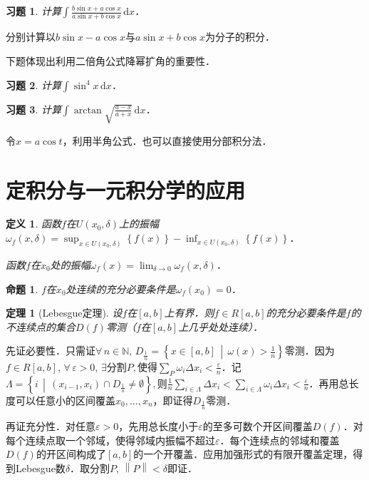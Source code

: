 \documentclass[11pt,a4paper]{ctexart}
\makeatletter
\theoremstyle{thmseries} %
\newtheorem{thm}{定理}[section]
\newtheorem{prop}{命题}[section]
\theoremstyle{exerseries}
\newtheorem{defn}{定义}[section]
\newtheorem{exer}{习题}[section]
\renewenvironment{proof}[1][\proofname]{\par
  \pushQED{\qed}%
  \normalfont \topsep6\p@\@plus6\p@\relax
  \trivlist
  \item[\hskip\labelsep
        \itshape
    #1\@addpunct{}]\ignorespaces
}{%
  \popQED\endtrivlist\@endpefalse
}
\newenvironment{sol}{\begin{proof}[\bfseries\upshape 解\quad]}{\end{proof}}
\newenvironment{pf}{\begin{proof}[\bfseries\upshape 证\quad]}{\end{proof}}
\newcommand{\cbra}[1]{\mathopen{}\left\{#1\right\}}
\renewcommand{\epsilon}{\varepsilon}
\newcommand{\N}{\mathbb{N}}
\renewcommand{\d}{\mathrm{d}}
\newcommand{\norm}[1]{\left\lVert #1 \right\rVert}
\makeatother
\begin{document}
\begin{exer}
	计算$\int\frac{b\sin x+a\cos x}{a\sin x+b\cos x}\,\d x$．
\end{exer}
\begin{sol}
	分别计算以$b\sin x-a\cos x$与$a\sin x+b\cos x$为分子的积分．
\end{sol}

下题体现出利用二倍角公式降幂扩角的重要性．
\begin{exer}
	计算$\int \sin^4x\,\d x$．
\end{exer}

\begin{exer}
	计算$\int\arctan\sqrt{\frac{a-x}{a+x}}\,\d x$．
\end{exer}
\begin{sol}
	令$x=a\cos t$，利用半角公式．也可以直接使用分部积分法．
\end{sol}


\section{定积分与一元积分学的应用}
\begin{defn}
	函数$f$在$U(x_0,\delta)$上的振幅$\omega_f(x,\delta)=\sup_{x\in U(x_0,\delta)}\cbra{f(x)}-\inf_{x\in U(x_0,\delta)}\cbra{f(x)}$．
	
	函数$f$在$x_0$处的振幅$\omega_f(x)=\lim_{\delta\to 0}\omega_f(x,\delta)$．
\end{defn}

\begin{prop}
	$f$在$x_0$处连续的充分必要条件是$\omega_f(x_0)=0$．
\end{prop}

\begin{thm}[Lebesgue定理]
	设$f$在$[a,b]$上有界．则$f\in R[a,b]$的充分必要条件是$f$的不连续点的集合$D(f)$零测（$f$在$[a,b]$上几乎处处连续）．
\end{thm}
\begin{pf}
	先证必要性．只需证$\forall\,n\in\N,\,D_\frac{1}{n}=\cbra{x\in[a,b]\,\middle\vert\,\omega(x)>\frac{1}{n}}$零测．因为$f\in R[a,b],\,\forall\,\epsilon>0,\,\exists$分割$P,$使得$\sum_P\omega_i\Delta x_i<\frac{\epsilon}{n}$．记$\Lambda=\cbra{i\,\middle\vert\,(x_{i-1},x_i)\cap D_\frac{1}{n}\neq\emptyset},$则$\frac{1}{n}\sum_{i\in\Lambda}\Delta x_i<\sum_{i\in\Lambda}\omega_i\Delta x_i<\frac{\epsilon}{n}$．再用总长度可以任意小的区间覆盖$x_0,\dots,x_n$，即证得$D_\frac{1}{n}$零测．

	再证充分性．对任意$\epsilon>0$，先用总长度小于$\epsilon$的至多可数个开区间覆盖$D(f)$．对每个连续点取一个邻域，使得邻域内振幅不超过$\epsilon$．每个连续点的邻域和覆盖$D(f)$的开区间构成了$[a,b]$的一个开覆盖．应用加强形式的有限开覆盖定理，得到Lebesgue数$\delta$．取分割$P,\,\norm{P}<\delta$即证．
\end{pf}
\end{document}
